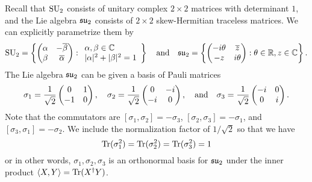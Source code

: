 \documentclass{../../templates/lkx_pset}
\begin{document}
\begin{parts}
	Recall that $\operatorname{SU}_2$ consists of unitary complex $2\times 2$ matrices with determinant $1$, and the Lie algebra $\mathfrak{su}_2$ consists of $2\times 2$ skew-Hermitian traceless matrices. We can explicitly parametrize them by
	\[
		\operatorname{SU}_2 = \left\{
		\begin{pmatrix} \alpha & -\overline{\beta}\\ \beta & \overline{\alpha}\end{pmatrix}
		:
		\begin{array}{l}\alpha,\beta\in \mathbb{C}\\|\alpha|^2+|\beta|^2=1\end{array}
		\right\}
		\quad\textrm{and}\quad
		\mathfrak{su}_2 = \left\{
		\begin{pmatrix}
			-i\theta & \overline{z} \\
			-z       & i\theta
		\end{pmatrix}
		:
		\theta\in \mathbb{R}, z\in \mathbb{C}
		\right\}.
	\]
	The Lie algebra $\mathfrak{su}_2$ can be given a basis of Pauli matrices
	\[
		\sigma_1 = \frac{1}{\sqrt{2}}\begin{pmatrix}0 & 1\\ -1 & 0\end{pmatrix},\quad
		\sigma_2 = \frac{1}{\sqrt{2}}\begin{pmatrix}0 & -i\\ -i & 0\end{pmatrix},\quad\textrm{and}\quad
		\sigma_3 = \frac{1}{\sqrt{2}}\begin{pmatrix}-i & 0\\ 0 & i\end{pmatrix}.
	\]
	Note that the commutators are $[\sigma_1, \sigma_2] = -\sigma_3$, $[\sigma_2, \sigma_3]=-\sigma_1$, and $[\sigma_3, \sigma_1]=-\sigma_2$. We include the normalization factor of $1/\sqrt{2}$ so that we have
	\[
    \textrm{Tr}(\sigma_1^2) = \operatorname{Tr}(\sigma_2^2) = \operatorname{Tr}(\sigma_3^2) = 1
	\]
	or in other words, $\sigma_1,\sigma_2,\sigma_3$ is an orthonormal basis for $\mathfrak{su}_2$ under the inner product $\langle X, Y\rangle=\operatorname{Tr}(X^\dagger Y)$.



\end{parts}
\end{document}
